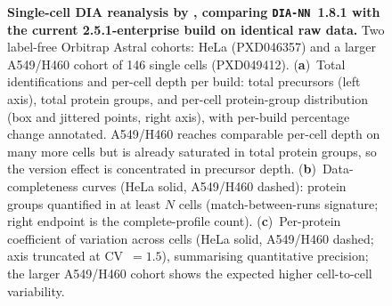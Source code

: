 \documentclass[preprint,12pt]{elsarticle}
\begin{document}
\begin{figure}[htbp]
  \centering
  \caption[Single-cell DIA reanalysis]{%
    \textbf{Single-cell DIA reanalysis by \quantmsdiann{}, comparing
    \texttt{DIA-NN}~1.8.1 with the current 2.5.1-enterprise build on identical
    raw data.} Two label-free Orbitrap Astral cohorts: HeLa (PXD046357) and a
    larger A549/H460 cohort of 146 single cells (PXD049412).
    (\textbf{a})~Total identifications and per-cell depth per build: total
    precursors (left axis), total protein groups, and per-cell protein-group
    distribution (box and jittered points, right axis), with per-build percentage
    change annotated. A549/H460 reaches comparable per-cell depth on many more
    cells but is already saturated in total protein groups, so the version effect
    is concentrated in precursor depth.
    (\textbf{b})~Data-completeness curves (HeLa solid, A549/H460 dashed): protein
    groups quantified in at least $N$ cells (match-between-runs signature; right
    endpoint is the complete-profile count).
    (\textbf{c})~Per-protein coefficient of variation across cells (HeLa solid,
    A549/H460 dashed; axis truncated at CV~$=1.5$), summarising quantitative
    precision; the larger A549/H460 cohort shows the expected higher
    cell-to-cell variability.
  }
  \label{fig:single-cell}
\end{figure}
\end{document}
